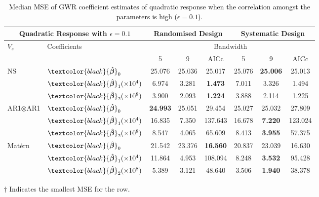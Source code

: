 \documentclass[a4paper]{article} 	%
\newcommand{\Matern}{Mat\'ern }
\newcommand{\zc}[1]{\textcolor{black}{#1}}
\begin{document}
\begin{table}[!htp]
	\centering
\begin{threeparttable}
	\caption{\zc{Median MSE of GWR coefficient estimates of quadratic response when the correlation amongst the parameters is high ($\epsilon=0.1$).}}\label{tb:MSEquadraticHigh}
\begin{tabular}{ll|ccc|ccc}
\toprule
\multicolumn{2}{c}{Quadratic Response with $\epsilon=0.1$} & \multicolumn{3}{c}{Randomised Design} & \multicolumn{3}{c}{Systematic Design} \\ \midrule
\multirow{2}{*}{$V_s$} & \multirow{2}{*}{Coefficients}  & \multicolumn{6}{c}{Bandwidth}\\ 
		  &  & 5  & 9  & AICc & 5  & 9  & AICc \\ \midrule
\multirow{3}{*}{NS} & $\zc{\hat{\bm{\beta}}}_0$  & 25.076 & 25.036 & 25.017    & 25.076 & \bf{25.006}\tnote{$\dagger$} & 25.013      \\
&$\zc{\hat{\bm{\beta}}}_1 (\times 10^4)$  & 6.974  & 3.281  &  \bf{1.473}\tnote{$\dagger$} & 7.011  & 3.326  & 1.494      \\
&$\zc{\hat{\bm{\beta}}}_2 (\times 10^8)$  & 3.900  & 2.093  & \bf{1.224}\tnote{$\dagger$}  & 3.888  & 2.114  & 1.225\\  \midrule
\multirow{3}{*}{AR1$\otimes$AR1} & $\zc{\hat{\bm{\beta}}}_0$ & \bf{24.993}\tnote{$\dagger$} & 25.051 & 29.454    & 25.027 & 25.032 & 27.809\\
& $\zc{\hat{\bm{\beta}}}_1 (\times 10^4)$ & 16.835 & 7.350  & 137.643   & 16.678 & \bf{7.220}\tnote{$\dagger$}  & 123.024  \\
& $\zc{\hat{\bm{\beta}}}_2 (\times 10^8)$  & 8.547  & 4.065  & 65.609    & 8.413  & \bf{3.955}\tnote{$\dagger$} & 57.375      \\  \midrule
\multirow{3}{*}{\Matern} & $\zc{\hat{\bm{\beta}}}_0$ & 21.542 & 23.376 & \bf{16.560}\tnote{$\dagger$}  & 20.837 & 23.039 & 16.630    \\
& $\zc{\hat{\bm{\beta}}}_1 (\times 10^4)$ & 11.864 & 4.953  & 108.094   & 8.248  & \bf{3.532}\tnote{$\dagger$}  & 95.428   \\
& $\zc{\hat{\bm{\beta}}}_2 (\times 10^8)$  & 5.389  & 3.121  & 48.640    & 3.506  & \bf{1.940}\tnote{$\dagger$}  & 38.378    \\ \bottomrule
\end{tabular}
\begin{tablenotes}
\item[$\dagger$] \footnotesize Indicates the smallest MSE for the row.
\end{tablenotes}
\end{threeparttable}
\end{table}
\end{document}
